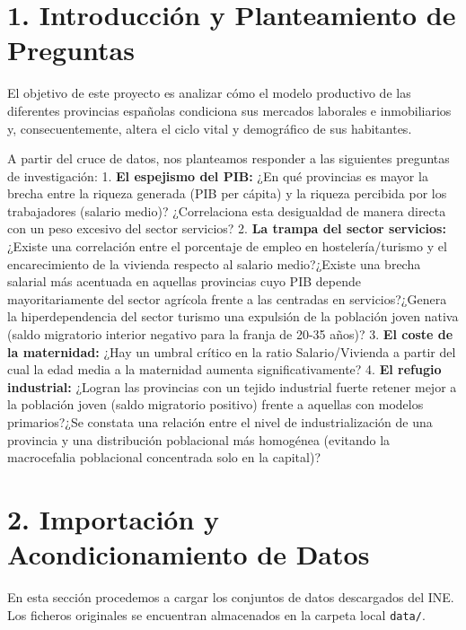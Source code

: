 \documentclass[data,article,submit,moreauthors,pdftex]{Definitions/mdpi}
\begin{document}

\section{1. Introducción y Planteamiento de
Preguntas}\label{introducciuxf3n-y-planteamiento-de-preguntas}

El objetivo de este proyecto es analizar cómo el modelo productivo de
las diferentes provincias españolas condiciona sus mercados laborales e
inmobiliarios y, consecuentemente, altera el ciclo vital y demográfico
de sus habitantes.

A partir del cruce de datos, nos planteamos responder a las siguientes
preguntas de investigación: 1. \textbf{El espejismo del PIB:} ¿En qué
provincias es mayor la brecha entre la riqueza generada (PIB per cápita)
y la riqueza percibida por los trabajadores (salario medio)?
¿Correlaciona esta desigualdad de manera directa con un peso excesivo
del sector servicios? 2. \textbf{La trampa del sector servicios:}
¿Existe una correlación entre el porcentaje de empleo en
hostelería/turismo y el encarecimiento de la vivienda respecto al
salario medio?¿Existe una brecha salarial más acentuada en aquellas
provincias cuyo PIB depende mayoritariamente del sector agrícola frente
a las centradas en servicios?¿Genera la hiperdependencia del sector
turismo una expulsión de la población joven nativa (saldo migratorio
interior negativo para la franja de 20-35 años)? 3. \textbf{El coste de
la maternidad:} ¿Hay un umbral crítico en la ratio Salario/Vivienda a
partir del cual la edad media a la maternidad aumenta
significativamente? 4. \textbf{El refugio industrial:} ¿Logran las
provincias con un tejido industrial fuerte retener mejor a la población
joven (saldo migratorio positivo) frente a aquellas con modelos
primarios?¿Se constata una relación entre el nivel de industrialización
de una provincia y una distribución poblacional más homogénea (evitando
la macrocefalia poblacional concentrada solo en la capital)?

\section{2. Importación y Acondicionamiento de
Datos}\label{importaciuxf3n-y-acondicionamiento-de-datos}

En esta sección procedemos a cargar los conjuntos de datos descargados
del INE. Los ficheros originales se encuentran almacenados en la carpeta
local \texttt{data/}.
\end{document}
